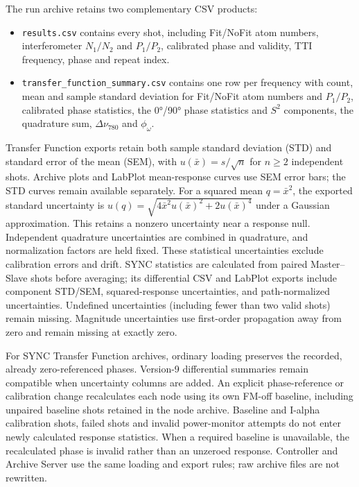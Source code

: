 \documentclass[11pt,oneside,openany]{book}
\newcommand{\pathcode}[1]{\nolinkurl{#1}}
\begin{document}
The run archive retains two complementary CSV products:
\begin{itemize}
  \item \pathcode{results.csv} contains every shot, including Fit/NoFit atom numbers,
  interferometer $N_1/N_2$ and $P_1/P_2$, calibrated phase and validity, TTI frequency,
  phase and repeat index.
  \item \pathcode{transfer_function_summary.csv} contains one row per frequency with
  count, mean and sample standard deviation for Fit/NoFit atom numbers and $P_1/P_2$,
  calibrated phase statistics, the \ang{0}/\ang{90} phase statistics and $S^2$ components,
  the quadrature sum, $\Delta\nu_{780}$ and $\phi_\omega$.
\end{itemize}
Transfer Function exports retain both sample standard deviation (STD) and standard
error of the mean (SEM), with $u(\bar{x})=s/\sqrt{n}$ for $n\geq2$ independent shots.
Archive plots and LabPlot mean-response curves use SEM error bars; the STD curves
remain available separately. For a squared mean $q=\bar{x}^2$, the exported standard
uncertainty is $u(q)=\sqrt{4\bar{x}^2u(\bar{x})^2+2u(\bar{x})^4}$ under a Gaussian
approximation. This retains a nonzero uncertainty near a response null. Independent
quadrature uncertainties are combined in quadrature, and normalization factors are
held fixed. These statistical uncertainties exclude calibration errors and drift.
SYNC statistics are calculated from paired Master--Slave shots before averaging;
its differential CSV and LabPlot exports include component STD/SEM, squared-response
uncertainties, and path-normalized uncertainties. Undefined uncertainties (including
fewer than two valid shots) remain missing. Magnitude uncertainties use first-order
propagation away from zero and remain missing at exactly zero.

For SYNC Transfer Function archives, ordinary loading preserves the recorded,
already zero-referenced phases. Version-9 differential summaries remain compatible
when uncertainty columns are added. An explicit phase-reference or calibration
change recalculates each node using its own FM-off baseline, including unpaired
baseline shots retained in the node archive. Baseline and I-alpha calibration shots,
failed shots and invalid power-monitor attempts do not enter newly calculated
response statistics. When a required baseline is unavailable, the recalculated
phase is invalid rather than an unzeroed response. Controller and Archive Server
use the same loading and export rules; raw archive files are not rewritten.
\end{document}
